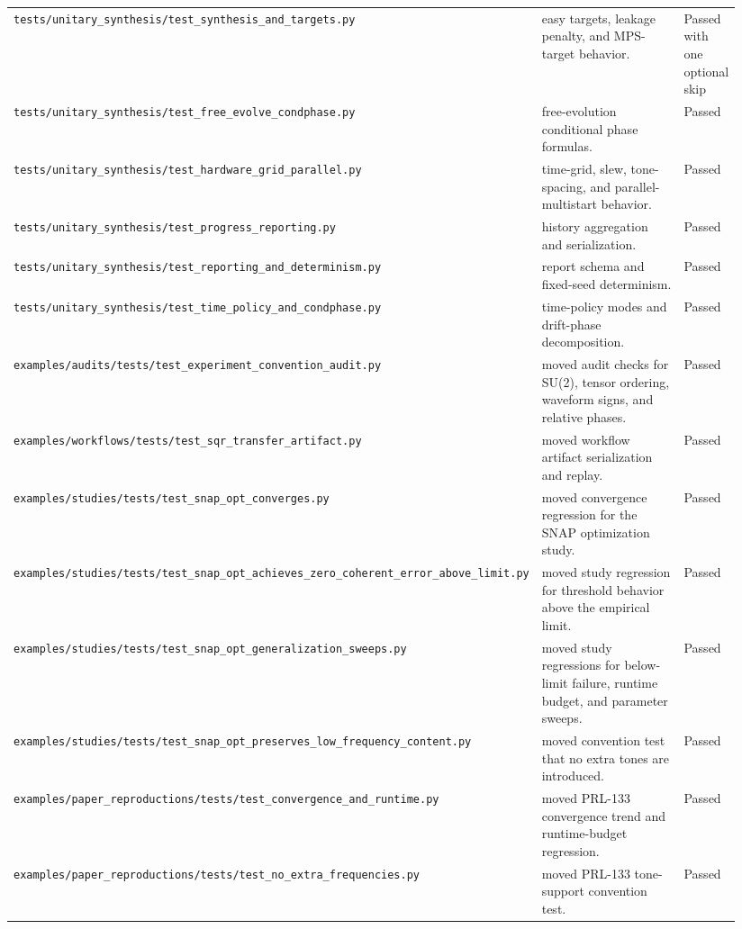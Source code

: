 \documentclass[11pt]{article}
\begin{document}
\begin{longtable}{p{0.30\linewidth} p{0.56\linewidth} p{0.08\linewidth}}
\texttt{tests/unitary\_synthesis/test\_synthesis\_and\_targets.py} & easy targets, leakage penalty, and MPS-target behavior. & Passed with one optional skip \\
\texttt{tests/unitary\_synthesis/test\_free\_evolve\_condphase.py} & free-evolution conditional phase formulas. & Passed \\
\texttt{tests/unitary\_synthesis/test\_hardware\_grid\_parallel.py} & time-grid, slew, tone-spacing, and parallel-multistart behavior. & Passed \\
\texttt{tests/unitary\_synthesis/test\_progress\_reporting.py} & history aggregation and serialization. & Passed \\
\texttt{tests/unitary\_synthesis/test\_reporting\_and\_determinism.py} & report schema and fixed-seed determinism. & Passed \\
\texttt{tests/unitary\_synthesis/test\_time\_policy\_and\_condphase.py} & time-policy modes and drift-phase decomposition. & Passed \\
\texttt{examples/audits/tests/test\_experiment\_convention\_audit.py} & moved audit checks for SU(2), tensor ordering, waveform signs, and relative phases. & Passed \\
\texttt{examples/workflows/tests/test\_sqr\_transfer\_artifact.py} & moved workflow artifact serialization and replay. & Passed \\
\texttt{examples/studies/tests/test\_snap\_opt\_converges.py} & moved convergence regression for the SNAP optimization study. & Passed \\
\texttt{examples/studies/tests/test\_snap\_opt\_achieves\_zero\_coherent\_error\_above\_limit.py} & moved study regression for threshold behavior above the empirical limit. & Passed \\
\texttt{examples/studies/tests/test\_snap\_opt\_generalization\_sweeps.py} & moved study regressions for below-limit failure, runtime budget, and parameter sweeps. & Passed \\
\texttt{examples/studies/tests/test\_snap\_opt\_preserves\_low\_frequency\_content.py} & moved convention test that no extra tones are introduced. & Passed \\
\texttt{examples/paper\_reproductions/tests/test\_convergence\_and\_runtime.py} & moved PRL-133 convergence trend and runtime-budget regression. & Passed \\
\texttt{examples/paper\_reproductions/tests/test\_no\_extra\_frequencies.py} & moved PRL-133 tone-support convention test. & Passed \\

\end{longtable}
\end{document}
